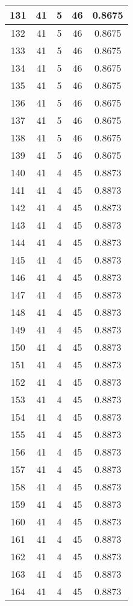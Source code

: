 \documentclass[letterpaper, 12pt]{article}
\begin{document}
\begin{longtable}{|c|c|c|c|c|}
\hline
131 & 41 & 5 & 46 & 0.8675 \\
\hline
132 & 41 & 5 & 46 & 0.8675 \\
\hline
133 & 41 & 5 & 46 & 0.8675 \\
\hline
134 & 41 & 5 & 46 & 0.8675 \\
\hline
135 & 41 & 5 & 46 & 0.8675 \\
\hline
136 & 41 & 5 & 46 & 0.8675 \\
\hline
137 & 41 & 5 & 46 & 0.8675 \\
\hline
138 & 41 & 5 & 46 & 0.8675 \\
\hline
139 & 41 & 5 & 46 & 0.8675 \\
\hline
140 & 41 & 4 & 45 & 0.8873 \\
\hline
141 & 41 & 4 & 45 & 0.8873 \\
\hline
142 & 41 & 4 & 45 & 0.8873 \\
\hline
143 & 41 & 4 & 45 & 0.8873 \\
\hline
144 & 41 & 4 & 45 & 0.8873 \\
\hline
145 & 41 & 4 & 45 & 0.8873 \\
\hline
146 & 41 & 4 & 45 & 0.8873 \\
\hline
147 & 41 & 4 & 45 & 0.8873 \\
\hline
148 & 41 & 4 & 45 & 0.8873 \\
\hline
149 & 41 & 4 & 45 & 0.8873 \\
\hline
150 & 41 & 4 & 45 & 0.8873 \\
\hline
151 & 41 & 4 & 45 & 0.8873 \\
\hline
152 & 41 & 4 & 45 & 0.8873 \\
\hline
153 & 41 & 4 & 45 & 0.8873 \\
\hline
154 & 41 & 4 & 45 & 0.8873 \\
\hline
155 & 41 & 4 & 45 & 0.8873 \\
\hline
156 & 41 & 4 & 45 & 0.8873 \\
\hline
157 & 41 & 4 & 45 & 0.8873 \\
\hline
158 & 41 & 4 & 45 & 0.8873 \\
\hline
159 & 41 & 4 & 45 & 0.8873 \\
\hline
160 & 41 & 4 & 45 & 0.8873 \\
\hline
161 & 41 & 4 & 45 & 0.8873 \\
\hline
162 & 41 & 4 & 45 & 0.8873 \\
\hline
163 & 41 & 4 & 45 & 0.8873 \\
\hline
164 & 41 & 4 & 45 & 0.8873 \\

\end{longtable}
\end{document}
